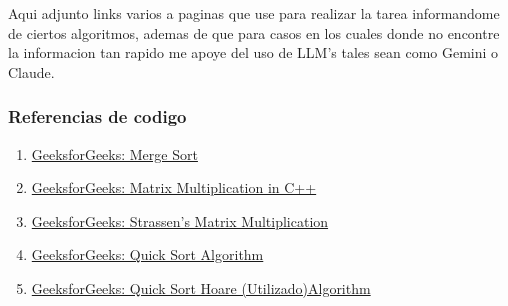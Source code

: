 Aqui adjunto links varios a paginas que use para realizar la tarea informandome de ciertos algoritmos, ademas de que para casos en los cuales donde no encontre la informacion tan rapido me apoye del uso de LLM's tales sean como Gemini o Claude.

\subsubsection{Referencias de codigo}

\begin{enumerate}
    \item \href{https://www.geeksforgeeks.org/dsa/merge-sort/}{GeeksforGeeks: Merge Sort}
    \item \href{https://www.geeksforgeeks.org/cpp/cpp-matrix-multiplication/}{GeeksforGeeks: Matrix Multiplication in C++}
    \item \href{https://www.geeksforgeeks.org/dsa/strassens-matrix-multiplication/}{GeeksforGeeks: Strassen's Matrix Multiplication}
    \item \href{https://www.geeksforgeeks.org/dsa/quick-sort-algorithm/}{GeeksforGeeks: Quick Sort Algorithm}
    \item \href{https://www.geeksforgeeks.org/dsa/hoares-vs-lomuto-partition-scheme-quicksort/}{GeeksforGeeks: Quick Sort Hoare (Utilizado)Algorithm}
\end{enumerate}